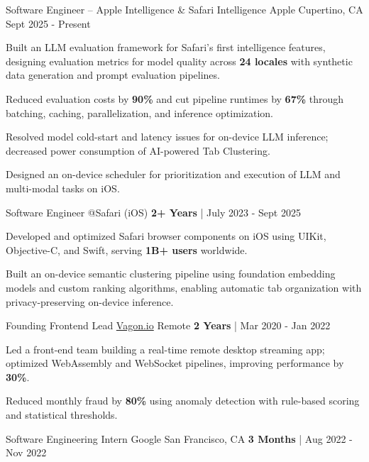\begin{cventries}
\cvexpentrydouble
  {Software Engineer -- Apple Intelligence \& Safari Intelligence}
  {Apple}
  {Cupertino, CA}
  {Sept 2025 - Present}
  {
    \begin{cvitems}
      \item {Built an LLM evaluation framework for Safari's first intelligence features, designing evaluation metrics for model quality across \textbf{24 locales} with synthetic data generation and prompt evaluation pipelines.}
      \item {Reduced evaluation costs by \textbf{90\%} and cut pipeline runtimes by \textbf{67\%} through batching, caching, parallelization, and inference optimization.}
      \item {Resolved model cold-start and latency issues for on-device LLM inference; decreased power consumption of AI-powered Tab Clustering.}
      \item {Designed an on-device scheduler for prioritization and execution of LLM and multi-modal tasks on iOS.}
    \end{cvitems}
  }
  {Software Engineer @Safari (iOS)}
  {\textbf{2+ Years} | July 2023 - Sept 2025}
  {
    \begin{cvitems}
      \item {Developed and optimized Safari browser components on iOS using UIKit, Objective-C, and Swift, serving \textbf{1B+ users} worldwide.}
      \item {Built an on-device semantic clustering pipeline using foundation embedding models and custom ranking algorithms, enabling automatic tab organization with privacy-preserving on-device inference.}
    \end{cvitems}
  }
  \cvexpentry
   {Founding Frontend Lead}
    {\href{https://vagon.io}{Vagon.io}}
    {Remote}
    {\textbf{2 Years} | Mar 2020 - Jan 2022}
    {
    \begin{cvitems}
      \item {Led a front-end team building a real-time remote desktop streaming app; optimized WebAssembly and WebSocket pipelines, improving performance by \textbf{30\%}.}
      \item {Reduced monthly fraud by \textbf{80\%} using anomaly detection with rule-based scoring and statistical thresholds.}
    \end{cvitems}
    }
  \cvexpentry
   {Software Engineering Intern}
    {Google}
    {San Francisco, CA}
    {\textbf{3 Months} | Aug 2022 - Nov 2022}
    {
}
\end{cventries}
